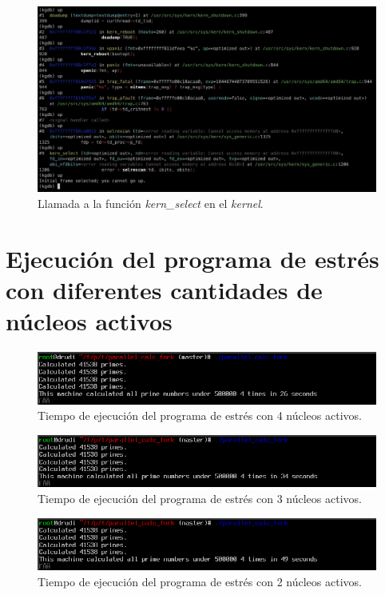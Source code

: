 \vspace{.50cm}
\begin{figure}[H]
    \centering
    \includegraphics[width=1\textwidth]{images/kgdb_kern-select.jpeg}
    \caption{Llamada a la función \textit{kern\_select} en el \textit{kernel}.}
    \label{fig:kgdb_kern-select}
\end{figure}

\section{Ejecución del programa de estrés con diferentes cantidades de núcleos activos}\label{appendix:apD}

\begin{figure}[H]
    \centering
    \includegraphics[width=1\textwidth]{images/cpuOnOff-4CPUsTime.png}
    \caption{Tiempo de ejecución del programa de estrés con 4 núcleos activos.}
    \label{fig:cpuOnOff-4CPUsTime}
\end{figure}

\begin{figure}[H]
    \centering
    \includegraphics[width=1\textwidth]{images/cpuOnOff-3CPUsTime.png}
    \caption{Tiempo de ejecución del programa de estrés con 3 núcleos activos.}
    \label{fig:cpuOnOff-3CPUsTime}
\end{figure}

\begin{figure}[H]
    \centering
    \includegraphics[width=1\textwidth]{images/cpuOnOff-2CPUsTime.png}
    \caption{Tiempo de ejecución del programa de estrés con 2 núcleos activos.}
    \label{fig:cpuOnOff-2CPUsTime}
\end{figure}



